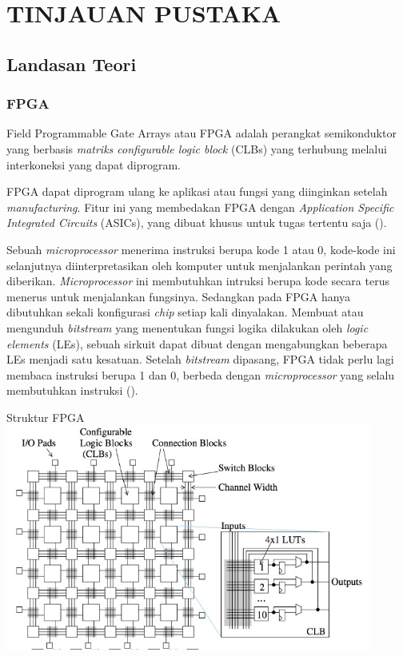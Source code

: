 
\chapter{TINJAUAN PUSTAKA}

\section{Landasan Teori}

\subsection{FPGA}
Field Programmable Gate Arrays atau FPGA adalah perangkat semikonduktor yang berbasis \textit{matriks configurable logic block} (CLBs) yang terhubung melalui interkoneksi yang dapat diprogram.

FPGA dapat diprogram ulang ke aplikasi atau fungsi yang diinginkan setelah \textit{manufacturing}. Fitur ini yang membedakan FPGA dengan \textit{Application Specific Integrated Circuits} (ASICs), yang dibuat khusus untuk tugas tertentu saja (\cite{XILINX}).

Sebuah \textit{microprocessor} menerima instruksi berupa kode 1 atau 0, kode-kode ini selanjutnya diinterpretasikan oleh komputer untuk menjalankan perintah yang diberikan. \textit{Microprocessor} ini membutuhkan intruksi berupa kode secara terus menerus untuk menjalankan fungsinya. Sedangkan pada FPGA hanya dibutuhkan sekali konfigurasi \textit{chip} setiap kali dinyalakan. Membuat atau mengunduh \textit{bitstream} yang menentukan fungsi logika dilakukan oleh \textit{logic elements} (LEs), sebuah sirkuit dapat dibuat dengan mengabungkan beberapa LEs menjadi satu kesatuan. Setelah \textit{bitstream} dipasang, FPGA tidak perlu lagi membaca instruksi berupa 1 dan 0, berbeda dengan \textit{microprocessor} yang selalu membutuhkan instruksi (\cite{pdf:cheung}).

\begin{afigure}{Struktur FPGA}
    \label{fig:fpga-structure}
    \includegraphics[width=12cm, center]{images/fpga-structure.jpeg}
\end{afigure}


